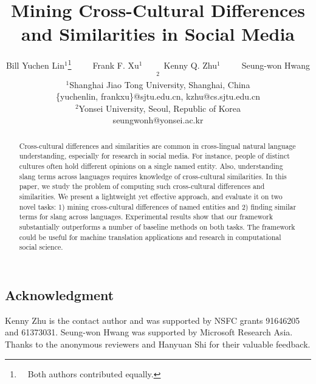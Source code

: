 \documentclass[11pt,a4paper]{article}
\title{Mining Cross-Cultural Differences and Similarities in Social Media}
\author{
	Bill Yuchen Lin{\small $^{1}$}\thanks{\scriptsize~~Both authors contributed equally.}~~~~~Frank F. Xu{\small $^{1}$}\footnotemark[1]~~~~~Kenny Q. Zhu{\small $^{1}$}~~~~~Seung-won Hwang{\small $^{2}$}\\ 
	{\small $^{1}$}Shanghai Jiao Tong University, Shanghai, China\\
	\{yuchenlin, frankxu\}@sjtu.edu.cn, kzhu@cs.sjtu.edu.cn\\
	{\small $^{2}$}Yonsei University, Seoul, Republic of Korea\\
	seungwonh@yonsei.ac.kr\\
}
\date{}
\begin{document}
\maketitle
\begin{abstract}
Cross-cultural differences and similarities are common in cross-lingual natural language understanding, especially for research in social media.
For instance, people of distinct cultures often hold different opinions on a single named entity.
Also, understanding slang terms across languages requires knowledge of cross-cultural similarities. 
In this paper, we study the problem of computing such cross-cultural differences and similarities.
We present a lightweight yet effective approach, and evaluate it on two novel tasks: 1) mining cross-cultural differences of named entities and 2) finding similar terms for slang across languages. 
Experimental results show that our framework substantially outperforms a number of baseline methods on both tasks.
The framework could be useful for machine translation applications and research in computational social science.
\end{abstract}

\begin{CJK}{UTF8}{gkai}
	
	
	
	
	
	
	 
	\section*{Acknowledgment}
Kenny Zhu is the contact author and was supported by NSFC grants 91646205 and 61373031. Seung-won Hwang was supported by Microsoft Research Asia. Thanks to the anonymous reviewers and Hanyuan Shi for their valuable feedback. 
\end{CJK}

%
%


\end{document}
